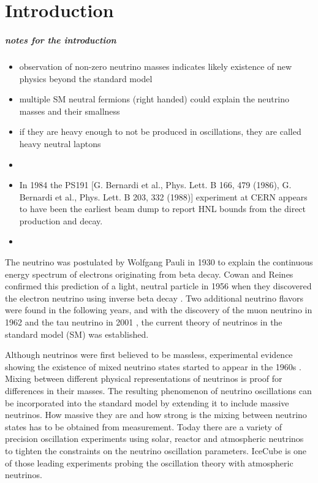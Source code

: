 \setchapterpreamble[u]{\margintoc}

\chapter{Introduction}




\paragraph{notes for the introduction}
\begin{itemize}
    \item observation of non-zero neutrino masses indicates likely existence of new physics beyond the standard model
    \item multiple SM neutral fermions (right handed) could explain the neutrino masses and their smallness
    \item if they are heavy enough to not be produced in oscillations, they are called heavy neutral laptons
    \item 
    \item In 1984 the PS191 [G. Bernardi et al., Phys. Lett. B 166, 479 (1986), G. Bernardi et al., Phys. Lett. B 203, 332 (1988)] experiment at CERN appears to have been the earliest beam dump to report HNL bounds from the direct production and decay.
    \item 
\end{itemize}


The neutrino was postulated by Wolfgang Pauli  in 1930 to explain the continuous energy spectrum of electrons originating from beta decay.
Cowan and Reines confirmed this prediction of a light, neutral particle in 1956 when they discovered the electron neutrino using inverse beta decay .
Two additional neutrino flavors were found in the following years, and with the discovery of the muon neutrino in 1962  and the tau neutrino in 2001 , the current theory of neutrinos in the standard model (SM) was established.

Although neutrinos were first believed to be massless, experimental evidence showing the existence of mixed neutrino states started to appear in the 1960s .
Mixing between different physical representations of neutrinos is proof for differences in their masses.
The resulting phenomenon of neutrino oscillations can be incorporated into the standard model by extending it to include massive neutrinos.
How massive they are and how strong is the mixing between neutrino states has to be obtained from measurement.
Today there are a variety of precision oscillation experiments using solar, reactor and atmospheric neutrinos to tighten the constraints on the neutrino oscillation parameters.
IceCube is one of those leading experiments probing the oscillation theory with atmospheric neutrinos.

